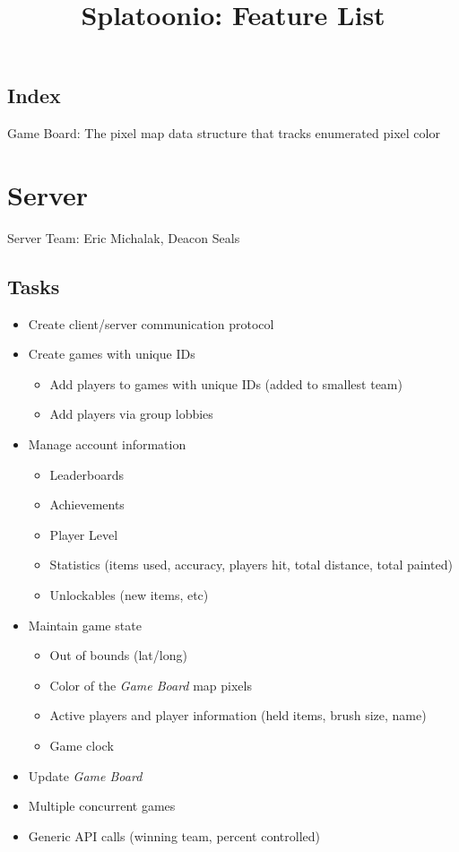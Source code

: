 \documentclass{article}
\title{Splatoonio: Feature List}
\author{}
\date{\vspace{-5ex}} %
\begin{document}
\maketitle
\tableofcontents

\subsection*{Index}
Game Board: The pixel map data structure that tracks enumerated pixel color

\newpage
\section{Server}
Server Team: Eric Michalak, Deacon Seals
\subsection{Tasks}
\begin{itemize}
\item Create client/server communication protocol
\item Create games with unique IDs
\begin{itemize}
	\item Add players to games with unique IDs (added to smallest team)
	\item Add players via group lobbies
\end{itemize}
\item Manage account information
	\begin{itemize}
	\item Leaderboards
    \item Achievements
    \item Player Level
    \item Statistics (items used, accuracy, players hit, total distance, total painted)
    \item Unlockables (new items, etc)
	\end{itemize}
\item Maintain game state
	\begin{itemize}
	\item Out of bounds (lat/long)
    \item Color of the \emph{Game Board} map pixels
    \item Active players and player information (held items, brush size, name)
    \item Game clock
	\end{itemize}
\item Update \emph{Game Board}
\item Multiple concurrent games
\item Generic API calls (winning team, percent controlled)
\end{itemize}
\end{document}
